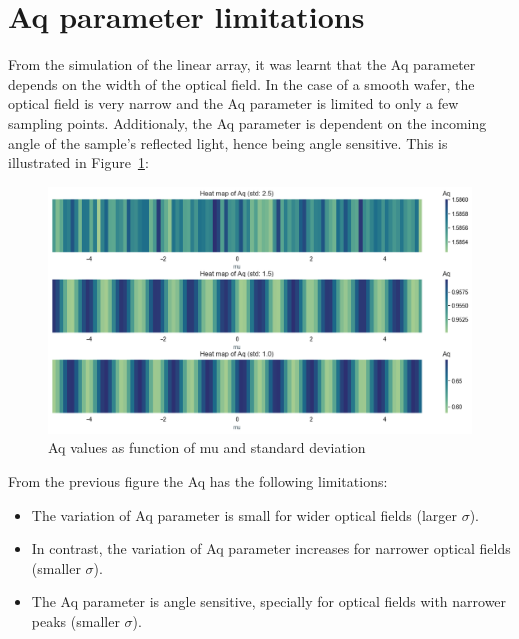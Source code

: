 \documentclass[
  letterpaper,
  DIV=11,
  numbers=noendperiod,
  oneside]{scrreprt}
\providecommand{\tightlist}{%
  \setlength{\itemsep}{0pt}\setlength{\parskip}{0pt}}\usepackage{longtable,booktabs,array}
\begin{document}
\hypertarget{aq-parameter-limitations}{%
\section{Aq parameter limitations}\label{aq-parameter-limitations}}

From the simulation of the linear array, it was learnt that the Aq
parameter depends on the width of the optical field. In the case of a
smooth wafer, the optical field is very narrow and the Aq parameter is
limited to only a few sampling points. Additionaly, the Aq parameter is
dependent on the incoming angle of the sample's reflected light, hence
being angle sensitive. This is illustrated in Figure~\ref{fig-2-4}:

\begin{figure}

{\centering \includegraphics{notebooks/a_optical_field_files/figure-pdf/fig-2-4-output-1.png}

}

\caption{\label{fig-2-4}Aq values as function of mu and standard
deviation}

\end{figure}

From the previous figure the Aq has the following limitations:

\begin{itemize}
\tightlist
\item
  The variation of Aq parameter is small for wider optical fields
  (larger \(\sigma\)).
\item
  In contrast, the variation of Aq parameter increases for narrower
  optical fields (smaller \(\sigma\)).
\item
  The Aq parameter is angle sensitive, specially for optical fields with
  narrower peaks (smaller \(\sigma\)).
\end{itemize}
\end{document}
